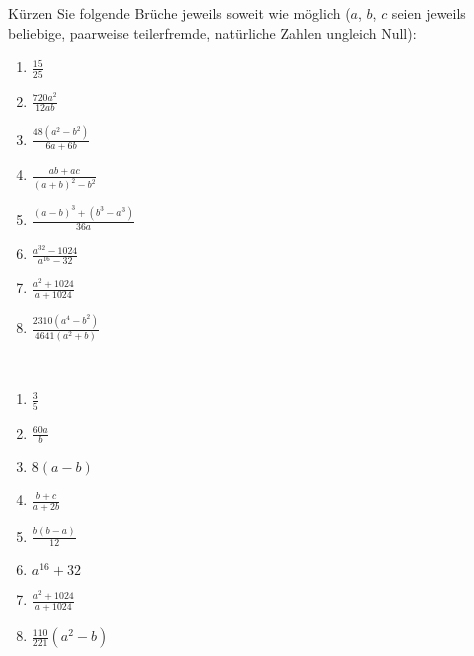 \documentclass[12pt]{exam}
\begin{document}
\begin{questions}
Kürzen Sie folgende Brüche jeweils soweit wie möglich ($a$, $b$, $c$ seien jeweils beliebige, paarweise teilerfremde, natürliche Zahlen ungleich Null):\\
\parbox{0.5\textwidth}{\begin{enumerate}
		\item $\frac{15}{25}$
		\item $\frac{720a^2}{12ab}$
		\item $\frac{48(a^2-b^2)}{6a+6b}$
		\item $\frac{ab+ac}{(a+b)^2-b^2}$
\end{enumerate}}\parbox{0.5\textwidth}{\begin{enumerate}\setcounter{enumi}{4}
		\item $\frac{(a-b)^3+(b^3-a^3)}{36a}$
		\item $\frac{a^{32}-1024}{a^{16}-32}$
		\item $\frac{a^2+1024}{a+1024}$
		\item $\frac{2310(a^4-b^2)}{4641(a^2+b)}$
\end{enumerate}}
\begin{solution}\\
	\parbox{0.5\textwidth}{\begin{enumerate}
			\item $\frac{3}{5}$
			\item $\frac{60a}{b}$
			\item $8(a-b)$
			\item $\frac{b+c}{a+2b}$
	\end{enumerate}}\parbox{0.5\textwidth}{\begin{enumerate}\setcounter{enumi}{4}
			\item $\frac{b(b-a)}{12}$
			\item $a^{16}+32$
			\item $\frac{a^2+1024}{a+1024}$
			\item $\frac{110}{221}(a^2-b)$
	\end{enumerate}}
\end{solution}




\end{questions}
\end{document}
